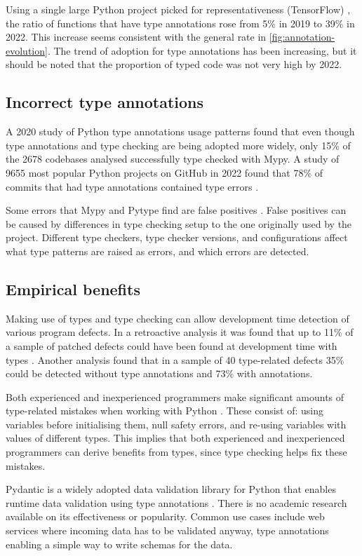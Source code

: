 Using a single large Python project picked for representativeness (TensorFlow) \cite{lin_towards_large_scale_2023}, the ratio of functions that have type annotations rose from 5\% in 2019 to 39\% in 2022. This increase seems consistent with the general rate in \ref{fig:annotation-evolution}.
The trend of adoption for type annotations has been increasing, but it should be noted that the proportion of typed code was not very high by 2022.

\subsection{Incorrect type annotations}

A 2020 study of Python type annotations usage patterns \cite{rak-amnouykit_taleoftwo_2020} found that even though type annotations and type checking are being adopted more widely, only 15\% of the 2678 codebases analysed successfully type checked with Mypy. A study of 9655 most popular Python projects on GitHub in 2022 found that 78\% of commits that had type annotations contained type errors \cite{di_grazia_evolution_2022}.

Some errors that Mypy and Pytype find are false positives \cite{rak-amnouykit_taleoftwo_2020}. False positives can be caused by differences in type checking setup to the one originally used by the project. Different type checkers, type checker versions, and configurations affect what type patterns are raised as errors, and which errors are detected.

\subsection{Empirical benefits}

Making use of types and type checking can allow development time detection of various program defects. In a retroactive analysis it was found that up to 11\% of a sample of patched defects could have been found at development time with types \cite{khan_empirical_2022}. Another analysis \cite{xu_how_well_static_2023} found that in a sample of 40 type-related defects 35\% could be detected without type annotations and 73\% with annotations.

Both experienced and inexperienced programmers make significant amounts of type-related mistakes when working with Python \cite{khan_empirical_2022}. These consist of: using variables before initialising them, null safety errors, and re-using variables with values of different types. This implies that both experienced and inexperienced programmers can derive benefits from types, since type checking helps fix these mistakes.

Pydantic is a widely adopted data validation library for Python that enables runtime data validation using type annotations \cite{pydanticdev_welcome_nodate}. There is no academic research available on its effectiveness or popularity. Common use cases include web services where incoming data has to be validated anyway, type annotations enabling a simple way to write schemas for the data.